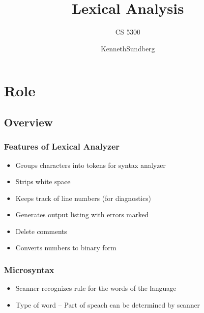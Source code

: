 \documentclass[usepdftitle=false,professionalfonts,compress ]{beamer}
\title{Lexical Analysis}
\subtitle{CS 5300}
\author{KennethSundberg}
\date{}
\begin{document}
\frame[plain]{
	\frametitle{}
	\titlepage
	\vspace{-0.5cm}
	\begin{center}
	\end{center}
}
\frame{
	\tableofcontents[hideallsubsections]
}
















\section{Role}
		
\subsection{Overview}

{
\begin{frame}\frametitle{Features of Lexical Analyzer}

	\begin{itemize}
	\item Groups characters into tokens for syntax analyzer
			\item Strips white space
			\item Keeps track of line numbers (for diagnostics)
			\item Generates output listing with errors marked
			\item Delete comments
			\item Converts numbers to binary form
				\end{itemize}

\end{frame}}








{
\begin{frame}\frametitle{Microsyntax}

	\begin{itemize}
	\item Scanner recognizes rule for the words of the language
			\item Type of word -- Part of speach can be determined by scanner
				\end{itemize}

\end{frame}}
\end{document}
